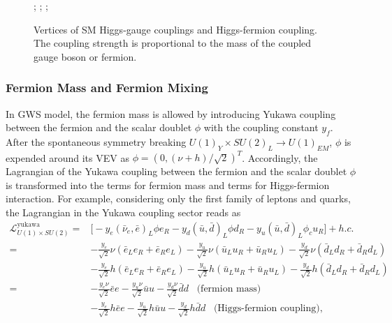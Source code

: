 \begin{figure}[ht]
    \centering
    ; \qquad
    ; \qquad 
    ; \qquad 
    \caption{Vertices of SM Higgs-gauge couplings and Higgs-fermion coupling. The coupling strength is proportional to the mass of the coupled gauge boson or fermion. }
    \label{fig:relatedWorks:qft:ewHiggsGaugeCoupling}
\end{figure}


\subsubsection{Fermion Mass and Fermion Mixing}

In GWS model, the fermion mass is allowed by introducing Yukawa coupling between the fermion and the scalar doublet $\phi$ with the coupling constant $y_f$. After the spontaneous symmetry breaking $U(1)_Y \times SU(2)_L \to U(1)_{EM}$, $\phi$ is expended around its VEV as $\phi=(0, (\nu+h)/\sqrt{2})^T$. Accordingly, the Lagrangian of the Yukawa coupling between the fermion and the scalar doublet $\phi$ is transformed into the terms for fermion mass and terms for Higgs-fermion interaction. For example, considering only the first family of leptons and quarks, the Lagrangian in the Yukawa coupling sector reads as
\begin{equation}
\begin{split}
	 \mathcal{L}_{U(1)\times SU(2)}^{\text{yukawa}} =& \big[ -y_e (\bar{\nu}_e,\bar{e})_L \phi e_R  -y_d (\bar{u},\bar{d})_L \phi d_R - y_u(\bar{u},\bar{d})_L \phi_c u_R \big ] + h.c. \\
     = & -\frac{y_e}{\sqrt{2}}\nu(\bar{e}_L e_R + \bar{e}_R e_L)   -\frac{y_u}{\sqrt{2}}\nu(\bar{u}_L u_R + \bar{u}_R u_L)  -\frac{y_d}{\sqrt{2}}\nu(\bar{d}_L d_R + \bar{d}_R d_L)  \\
     & -\frac{y_e}{\sqrt{2}}h(\bar{e}_L e_R + \bar{e}_R e_L)  - \frac{y_u}{\sqrt{2}}h(\bar{u}_L u_R + \bar{u}_R u_L)  - \frac{y_d}{\sqrt{2}}h(\bar{d}_L d_R + \bar{d}_R d_L)  \\
     = & -\frac{y_e\nu}{\sqrt{2}}\bar{e} e   -\frac{y_u\nu}{\sqrt{2}}\bar{u}u -\frac{y_d\nu}{\sqrt{2}} \bar{d} d \;\;\; \text{(fermion mass)} \\
     & -\frac{y_e}{\sqrt{2}}h\bar{e} e   -\frac{y_u}{\sqrt{2}}h\bar{u}u -\frac{y_d}{\sqrt{2}} h \bar{d} d \;\;\; \text{(Higgs-fermion coupling)},
\end{split}
\label{eqn:relatedWorks:qft:gws:yukawaLagragian}
\end{equation}


